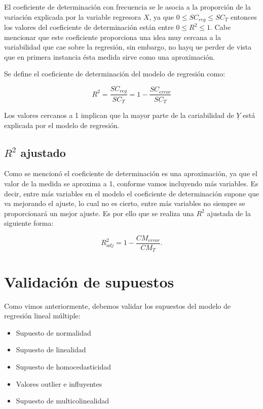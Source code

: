 \documentclass[
  a4paper,
  oneside,
  openany]{book}
\begin{document}
El coeficiente de determinación con frecuencia se le asocia a la proporción de la variación explicada por la variable regresora \(X\), ya que \(0 \leq SC_{reg} \leq SC_{T}\) entonces los valores del coeficiente de determinación están entre \(0 \leq R^2 \leq 1.\) Cabe mencionar que este coeficiente proporciona una idea muy cercana a la variabilidad que cae sobre la regresión, sin embargo, no hayq ue perder de vista que en primera instancia ésta medida sirve como una aproximación.

Se define el coeficiente de determinación del modelo de regresión como:

\[R^2=\frac{SC_{reg}}{SC_{T}}=1-\frac{SC_{error}}{SC_{T}}\]

Los valores cercanos a 1 implican que la mayor parte de la cariabilidad de \(\underline{Y}\) está explicada por el modelo de regresión.

\hypertarget{r2-ajustado}{%
\section{\texorpdfstring{\(R^2\) ajustado}{R\^{}2 ajustado}}\label{r2-ajustado}}

Como se mencionó el coeficiente de determinación es una aproximación, ya que el valor de la medida se aproxima a 1, conforme vamos incluyendo más variables. Es decir, entre más variables en el modelo el coeficiente de determinación supone que va mejorando el ajuste, lo cual no es cierto, entre más variables no siempre se proporcionará un mejor ajuste.
Es por ello que se realiza una \(R^2\) ajustada de la siguiente forma:

\[R^2_{adj}=1- \frac{CM_{error}}{CM_{T}}.\]

\hypertarget{validaciuxf3n-de-supuestos-1}{%
\chapter{Validación de supuestos}\label{validaciuxf3n-de-supuestos-1}}

Como vimos anteriormente, debemos validar los supuestos del modelo de regresión lineal múltiple:

\begin{itemize}
\item
  Supuesto de normalidad
\item
  Supuesto de linealidad
\item
  Supuesto de homocedasticidad
\item
  Valores outlier e influyentes
\item
  Supuesto de multicolinealidad
\end{itemize}
\end{document}
